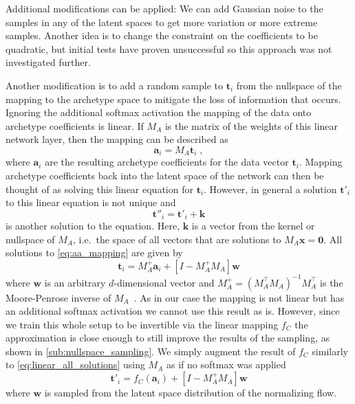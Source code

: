 Additional modifications can be applied: We can add Gaussian noise to the
samples in any of the latent spaces to get more variation or more extreme
samples. Another idea is to change the constraint on the coefficients to be
quadratic, but initial tests have proven unsuccessful so this approach was not
investigated further.

Another modification is to add a random sample to $\mathbf{t}_i$ from the
nullspace of the mapping to the archetype space to mitigate the loss of
information that occurs. Ignoring the additional softmax activation the
mapping of the data onto archetype coefficients is linear. If $M_A$ is the
matrix of the weights of this linear network layer, then the mapping can be
described as
\begin{equation}%
	\label{eq:aa_mapping}
	\mathbf{a}_i = M_A \mathbf{t}_i\;,
\end{equation}
where $\mathbf{a}_i$ are the resulting archetype coefficients for the data vector
$\mathbf{t}_i$. Mapping archetype coefficients back into the latent space of
the network can then be thought of as solving this linear equation for
$\mathbf{t}_i$. However, in general a solution $\mathbf{t}'_i$ to this linear
equation is not unique and
\begin{equation}
	\mathbf{t}''_i = \mathbf{t}'_i + \mathbf{k}
\end{equation}
is another solution to the equation. Here, $\mathbf{k}$ is a vector from the
kernel or nullspace of $M_A$, i.e.\ the space of all vectors that are solutions to
$M_A \mathbf{x} = \mathbf{0}$. All solutions to \autoref{eq:aa_mapping} are
given by
\begin{equation}%
	\label{eq:linear_all_solutions}
	\mathbf{t}_i = M_A^+ \mathbf{a}_i + [I - M_A^+ M_A] \mathbf{w}
\end{equation}
where $\mathbf{w}$ is an arbitrary $d$-dimensional vector and $M_A^+ =
	(M_A^\top M_A)^{-1} M_A^\top$ is the Moore-Penrose inverse of
$M_A$~\citep{jamesGeneralisedInverse1978}. As in our case the mapping is not
linear but has an additional softmax activation we cannot use this result as
is. However, since we train this whole setup to be invertible via the linear
mapping $f_C$ the approximation is close enough to still improve the results of
the sampling, as shown in \autoref{sub:nullspace_sampling}. We simply augment
the result of $f_C$ similarly to \autoref{eq:linear_all_solutions} using $M_A$
as if no softmax was applied
\begin{equation}%
	\label{eq:augmented_t}
	\mathbf{t}'_i = f_C(\mathbf{a}_i) + [I - M_A^+ M_A] \mathbf{w}
\end{equation}
where $\mathbf{w}$ is sampled from the latent space distribution of the
normalizing flow.

